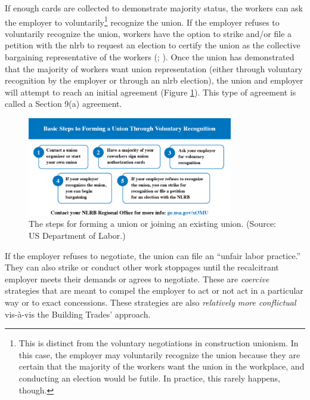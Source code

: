 \documentclass[12pt]{article}
\newcommand{\imageWidth}{0.8\textwidth}
\begin{document}
\noindent{}If enough cards are collected to demonstrate majority status, the workers can ask the employer to voluntarily\footnote{This is distinct from the voluntary negotiations in construction unionism. In this case, the employer may voluntarily recognize the union because they are certain that the majority of the workers want the union in the workplace, and conducting an election would be futile. In practice, this rarely happens, though.} recognize the union. If the employer refuses to voluntarily recognize the union, workers have the option to strike and/or file a petition with the \acrshort{nlrb} to request an election to certify the union as the collective bargaining representative of the workers (\cite["How can I form a union?"]{dolWORKCenterUnions}; \cite{nlrbNLRBProcess}). Once the union has demonstrated that the majority of workers want union representation (either through voluntary recognition by the employer or through an \acrshort{nlrb} election), the union and employer will attempt to reach an initial agreement (Figure \ref{fig:DOL}). This type of agreement is called a Section 9(a) agreement.

\begin{figure}[ht]
  \centering
  \includegraphics[width=\imageWidth]{images/DOL}
  \captionsetup{justification=centering, singlelinecheck=false, margin=2cm}
  \caption[Forming a Union]{The steps for forming a union or joining an existing union. (Source: US Department of Labor.)}
  \label{fig:DOL}
\end{figure}

If the employer refuses to negotiate, the union can file an “unfair labor practice.” They can also strike or conduct other work stoppages until the recalcitrant employer meets their demands or agrees to negotiate. These are \textit{coercive} strategies that are meant to compel the employer to act or not act in a particular way or to exact concessions. These strategies are also \textit{relatively more conflictual} vis-\`a-vis the Building Trades' approach.
\end{document}
